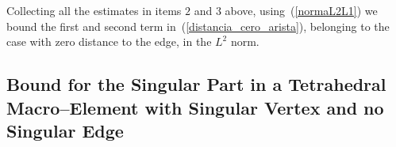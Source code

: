 Collecting all the estimates in items $2$ and $3$ above, using~(\ref{normaL2L1})
we bound the first and second term in~(\ref{distancia_cero_arista}), 
belonging to the case with zero distance
to the edge, in the $L^2$ norm.

\subsection{Bound for the Singular Part in a Tetrahedral Macro--Element
with Singular Vertex and no Singular Edge}
